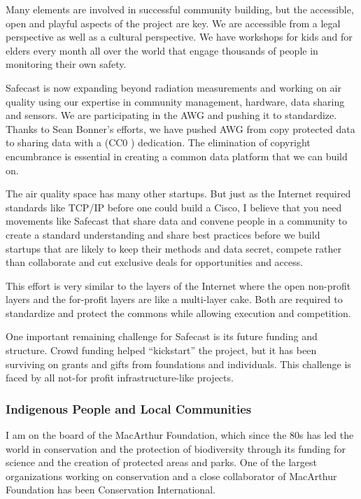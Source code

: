 Many elements are involved in successful community building, but the accessible, open and playful aspects of the project are key. We are accessible from a legal perspective as well as a cultural perspective. We have workshops for kids and for elders every month all over the world that engage thousands of people in monitoring their own safety.

Safecast is now expanding beyond radiation measurements and working on air quality using our expertise in community management, hardware, data sharing and sensors. We are participating in the \ac{AWG} and pushing it to standardize. Thanks to Sean Bonner's efforts, we have pushed \ac{AWG} from copy protected data to sharing data with a (CC0 \ccZero) dedication. The elimination of copyright encumbrance is essential in creating a common data platform that we can build on. 

The air quality space has many other startups. But just as the Internet required standards like \ac{TCP/IP} before one could build a Cisco, I believe that you need movements like Safecast that share data and convene people in a community to create a standard understanding and share best practices before we build startups that are likely to keep their methods and data secret, compete rather than collaborate and cut exclusive deals for opportunities and access.

This effort is very similar to the layers of the Internet where the open non-profit layers and the for-profit layers are like a multi-layer cake. Both are required to standardize and protect the commons while allowing execution and competition.

One important remaining challenge for Safecast is its future funding and structure. Crowd funding helped ``kickstart'' the project, but it has been surviving on grants and gifts from foundations and individuals. This challenge is faced by all not-for profit infrastructure-like projects.

\subsubsection{Indigenous People and Local Communities}
\label{sec:indigenous}

I am on the board of the MacArthur Foundation, which since the 80s has led the world in conservation and the protection of biodiversity through its funding for science and the creation of protected areas and parks. One of the largest organizations working on conservation and a close collaborator of MacArthur Foundation has been Conservation International.

